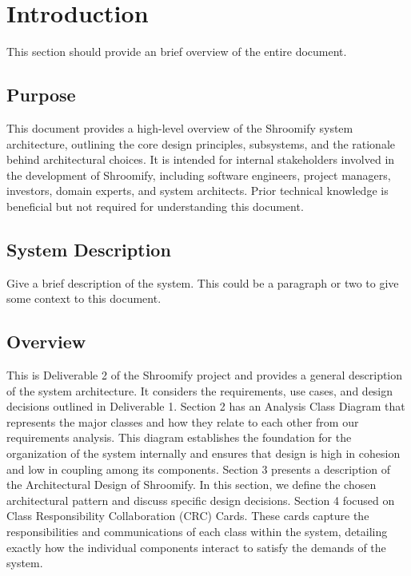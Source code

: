 \documentclass[]{article}
\begin{document}
\newpage
\section{Introduction}
\label{sec:introduction}

This section should provide an brief overview of the entire document.

\subsection{Purpose}
\label{sub:purpose}
This document provides a high-level overview of the Shroomify system architecture, outlining the core design principles, subsystems, and the rationale behind architectural choices. It is intended for internal stakeholders involved in the development of Shroomify, including software engineers, project managers, investors, domain experts, and system architects. Prior technical knowledge is beneficial but not required for understanding this document. 

\subsection{System Description}
\label{sub:system_description}
Give a brief description of the system. This could be a paragraph or two to give some context to this document.


\subsection{Overview}
\label{sub:overview}
This is Deliverable 2 of the Shroomify project and provides a general description of the system architecture. It considers the requirements, use cases, and design decisions outlined in Deliverable 1. Section 2 has an Analysis Class Diagram that represents the major classes and how they relate to each other from our requirements analysis. This diagram establishes the foundation for the organization of the system internally and ensures that design is high in cohesion and low in coupling among its components. Section 3 presents a description of the Architectural Design of Shroomify. In this section, we define the chosen architectural pattern and discuss specific design decisions. Section 4 focused on Class Responsibility Collaboration (CRC) Cards. These cards capture the responsibilities and communications of each class within the system, detailing exactly how the individual components interact to satisfy the demands of the system.
\end{document}
